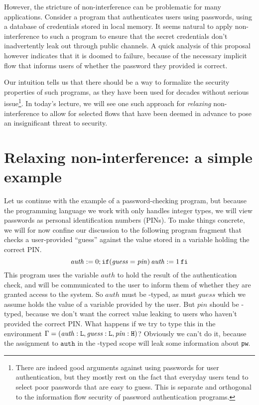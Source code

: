 \documentclass[11pt,twoside]{scrartcl}
\begin{document}
However, the stricture of non-interference can be problematic for many applications. Consider a program that authenticates users using passwords, using a database of credentials stored in local memory. It seems natural to apply non-interference to such a program to ensure that the secret credentials don't inadvertently leak out through public channels. A quick analysis of this proposal however indicates that it is doomed to failure, because of the necessary implicit flow that informs users of whether the password they provided is correct.

Our intuition tells us that there should be a way to formalize the security properties of such programs, as they have been used for decades without serious issue\footnote{There are indeed good arguments against using passwords for user authentication, but they mostly rest on the fact that everyday users tend to select poor passwords that are easy to guess. This is separate and orthogonal to the information flow security of password authentication programs.}. In today's lecture, we will see one such approach for \emph{relaxing} non-interference to allow for selected flows that have been deemed in advance to pose an insignificant threat to security.

\section{Relaxing non-interference: a simple example}

Let us continue with the example of a password-checking program, but because the programming language we work with only handles integer types, we will view passwords as personal identification numbers (PINs). To make things concrete, we will for now confine our discussion to the following program fragment that checks a user-provided ``guess'' against the value stored in a variable holding the correct PIN.
\begin{equation}
\mathit{auth} := 0; \texttt{\upshape if}(\mathit{guess} = \mathit{pin})\,\mathit{auth}:=1\texttt{\upshape \,fi}
\end{equation}
This program uses the variable $\mathit{auth}$ to hold the result of the authentication check, and will be communicated to the user to inform them of whether they are granted access to the system. So $\mathit{auth}$ must be \lowsec-typed, as must $\mathit{guess}$ which we assume holds the value of a variable provided by the user. But $\mathit{pin}$ should be \hisec-typed, because we don't want the correct value leaking to users who haven't provided the correct PIN.
What happens if we try to type this in the environment $\Gamma = (\mathit{auth} : \texttt{\upshape L}, \mathit{guess} : \texttt{\upshape L}, \mathit{pin} : \texttt{\upshape H})$? Obviously we can't do it, because the assignment to $\mathtt{auth}$ in the \hisec-typed scope will leak some information about \texttt{pw}. 
\end{document}
